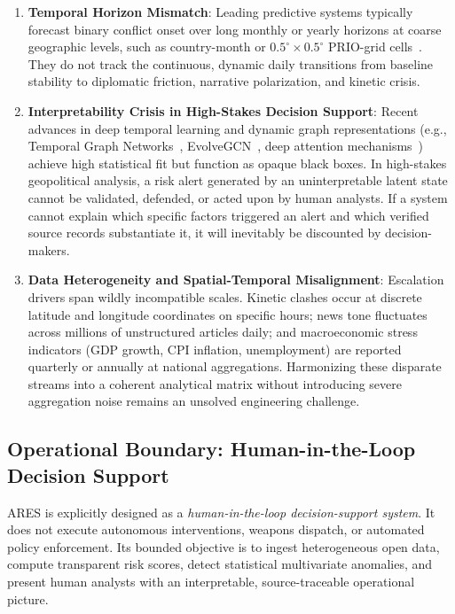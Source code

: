 \documentclass[preprint,12pt]{elsarticle}
\begin{document}
\begin{enumerate}
    \item \textbf{Temporal Horizon Mismatch}: Leading predictive systems typically forecast binary conflict onset over long monthly or yearly horizons at coarse geographic levels, such as country-month or $0.5^\circ \times 0.5^\circ$ PRIO-grid cells~\cite{hegre2019views, hegre2018forecasting, hegre2019predicting}. They do not track the continuous, dynamic daily transitions from baseline stability to diplomatic friction, narrative polarization, and kinetic crisis.
    \item \textbf{Interpretability Crisis in High-Stakes Decision Support}: Recent advances in deep temporal learning and dynamic graph representations (e.g., Temporal Graph Networks~\cite{rossi2020temporal}, EvolveGCN~\cite{pareja2020evolvegcn}, deep attention mechanisms~\cite{hossain2023identifying}) achieve high statistical fit but function as opaque black boxes. In high-stakes geopolitical analysis, a risk alert generated by an uninterpretable latent state cannot be validated, defended, or acted upon by human analysts. If a system cannot explain which specific factors triggered an alert and which verified source records substantiate it, it will inevitably be discounted by decision-makers.
    \item \textbf{Data Heterogeneity and Spatial-Temporal Misalignment}: Escalation drivers span wildly incompatible scales. Kinetic clashes occur at discrete latitude and longitude coordinates on specific hours; news tone fluctuates across millions of unstructured articles daily; and macroeconomic stress indicators (GDP growth, CPI inflation, unemployment) are reported quarterly or annually at national aggregations. Harmonizing these disparate streams into a coherent analytical matrix without introducing severe aggregation noise remains an unsolved engineering challenge.
\end{enumerate}

\subsection{Operational Boundary: Human-in-the-Loop Decision Support}
ARES is explicitly designed as a \emph{human-in-the-loop decision-support system}. It does not execute autonomous interventions, weapons dispatch, or automated policy enforcement. Its bounded objective is to ingest heterogeneous open data, compute transparent risk scores, detect statistical multivariate anomalies, and present human analysts with an interpretable, source-traceable operational picture.
\end{document}
